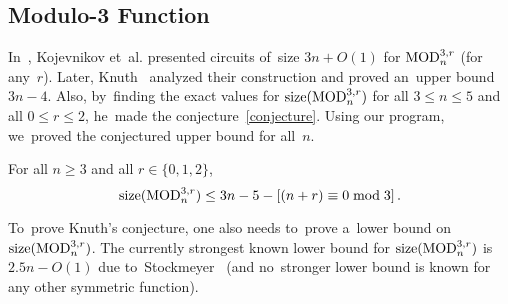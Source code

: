 \subsection{Modulo-3 Function}
In~\cite{DBLP:conf/sat/KojevnikovKY09}, Kojevnikov et~al.
presented circuits of~size $3n+O(1)$ for $\operatorname{MOD}_n^{3,r}$ (for any~$r$). Later,
Knuth~\cite[solution to exercise~$480$]{Knuth:2015:ACP:2898950} analyzed their construction and proved an~upper
bound $3n-4$. Also, by~finding the exact values
for $\operatorname{size}(\operatorname{MOD}_n^{3,r})$ for all $3 \le n \le 5$ and all $0 \le r \le 2$, he~made the conjecture~\eqref{conjecture}.
Using our program, we~proved the conjectured upper bound for all~$n$.

\begin{theorem}\label{theorem:mod3upper}
For all $n \ge 3$ and all $r \in \{0,1,2\}$,
\[\operatorname{size}(\operatorname{MOD}_n^{3,r}) \le 3n-5-[(n+r) \equiv 0\bmod 3] \,. \]
\end{theorem}

To~prove Knuth's conjecture, one also needs to~prove a~lower bound on $\operatorname{size}(\operatorname{MOD}_n^{3,r})$. The currently strongest known lower bound for $\operatorname{size}(\operatorname{MOD}_n^{3,r})$
is~$2.5n-O(1)$ due to~Stockmeyer~\cite{DBLP:journals/mst/Stockmeyer77}
(and no~stronger lower bound is known for any other symmetric function).

